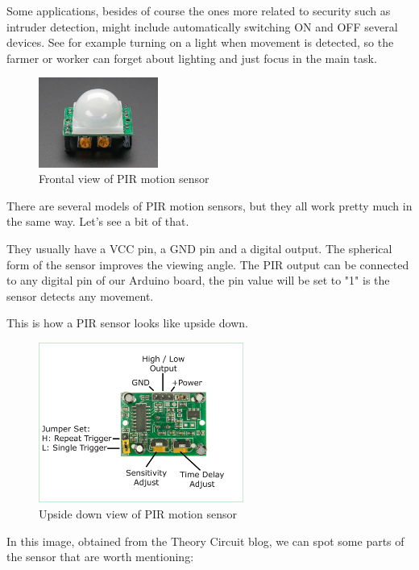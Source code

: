 Some applications, besides of course the ones more related to security such as intruder detection, might include automatically switching ON and OFF several devices. See for example turning on a light when movement is detected, so the farmer or worker can forget about lighting and just focus in the main task.

\begin{figure}[H]
    \centering
    \includegraphics[width=0.35\textwidth]{fig/pir.jpg}
    \caption{Frontal view of PIR motion sensor}
    \label{fig:pir}
\end{figure}


There are several models of PIR motion sensors, but they all work pretty much in the same way. Let's see a bit of that.

They usually have a VCC pin, a GND pin and a digital output. The spherical form of the sensor improves the viewing angle. The PIR output can be connected to any digital pin of our Arduino board, the pin value will be set to "1" is the sensor detects any movement.

This is how a PIR sensor looks like upside down.

\begin{figure}[H]
    \centering
    \includegraphics[width=0.6\textwidth]{fig/pir-upside-down.png}
    \caption{Upside down view of PIR motion sensor}
    \label{fig:pir-upsidedown}
\end{figure}

In this image, obtained from the Theory Circuit\cite{theory-circuit} blog, we can spot some parts of the sensor that are worth mentioning:

